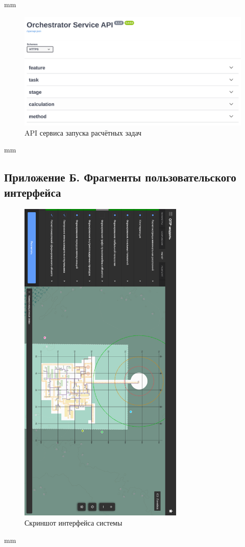  mm
\begin{figure}[H]
	\includegraphics[width=\textwidth]{applications/pictures/orchestrator_swagger}
	\caption{API сервиса запуска расчётных задач}
	\label{pic:application__orchestrator-swagger}
\end{figure}
 mm


\renewcommand{\thefigure}{Б\arabic{figure}}

\setcounter{figure}{0}

\subsection*{\large{Приложение Б. Фрагменты пользовательского интерфейса}}

\begin{figure}[H]
	\includegraphics[width=0.7\textwidth]{applications/pictures/system}
	\caption{Скриншот интерфейса системы}
	\label{pic:application__system}
\end{figure}
 mm